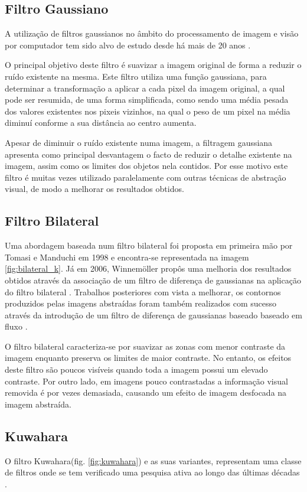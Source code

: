 \subsection{Filtro Gaussiano} \label{subsec:gaussian}
A utilização de filtros gaussianos no âmbito do processamento de imagem e visão por computador tem sido alvo de estudo desde há mais de 20 anos \cite{373563}.

O principal objetivo deste filtro é suavizar a imagem original de forma a reduzir o ruído existente na mesma. Este filtro utiliza uma função gaussiana, para determinar a transformação a aplicar a cada pixel da imagem original, a qual pode ser resumida, de uma forma simplificada, como sendo uma média pesada dos valores existentes nos pixeis vizinhos, na qual o peso de um pixel na média diminuí conforme a sua distância ao centro aumenta.

Apesar de diminuir o ruído existente numa imagem, a filtragem gaussiana apresenta como principal desvantagem o facto de reduzir o detalhe existente na imagem, assim como os limites dos objetos nela contidos. Por esse motivo este filtro é muitas vezes utilizado paralelamente com outras técnicas de abstração visual, de modo a melhorar os resultados obtidos.

\subsection{Filtro Bilateral} \label{subsec:bilateral}
Uma abordagem baseada num filtro bilateral foi proposta em primeira mão por Tomasi e Manduchi em 1998 \cite{Tomasi1998} e encontra-se representada na imagem \ref{fig:bilateral_k}. Já em 2006, Winnemöller propôs uma melhoria dos resultados obtidos através da associação de um filtro de diferença de gaussianas na aplicação do filtro bilateral \cite{Winnemoller2006}. Trabalhos posteriores com vista a melhorar, os contornos produzidos pelas imagens abstraídas foram também realizados com sucesso através da introdução de um filtro de diferença de gaussianas baseado baseado em fluxo \cite{Kang2009}.

O filtro bilateral caracteriza-se por suavizar as zonas com menor contraste da imagem enquanto preserva os limites de maior contraste. No entanto, os efeitos deste filtro são poucos visíveis quando toda a imagem possui um elevado contraste. Por outro lado, em imagens pouco contrastadas a informação visual removida é por vezes demasiada, causando um efeito de imagem desfocada na imagem abstraída.

\subsection{Kuwahara} \label{subsec:kuwahara}
O filtro Kuwahara(fig. \ref{fig:kuwahara}) e as suas variantes, representam uma classe de filtros onde se tem verificado uma pesquisa ativa ao longo das últimas décadas \cite{Kyprianidis2009}.

